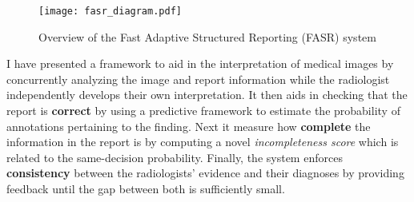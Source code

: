 \begin{figure}[h]
	\centering
	\texttt{[image: fasr\_diagram.pdf]}
	\caption{Overview of the Fast Adaptive Structured Reporting (FASR) system}
	\label{fig:fasr_diagram2}
\end{figure} 

I have presented a framework to aid in the interpretation of medical images by concurrently analyzing the image and report information while the radiologist independently develops their own interpretation. It then aids in checking that the report is \textbf{correct} by using a predictive framework to estimate the probability of annotations pertaining to the finding. Next it measure how \textbf{complete} the information in the report is by computing a novel \emph{incompleteness score} which is related to the same-decision probability. Finally, the system enforces \textbf{consistency} between the radiologists' evidence and their diagnoses by providing feedback until the gap between both is sufficiently small. 

